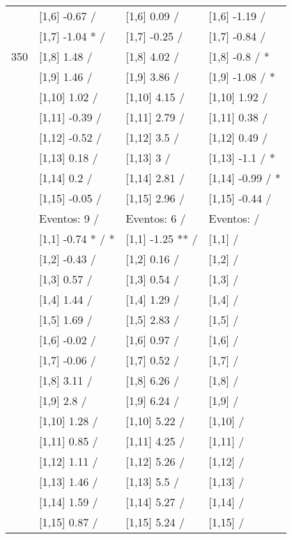 \begin{table}
\begin{tabular}[t]{llll}
 & {}[1,6] -0.67  / & {}[1,6] 0.09  / & {}[1,6] -1.19  /\\
 & {}[1,7] -1.04 * / & {}[1,7] -0.25  / & {}[1,7] -0.84  /\\
350 & {}[1,8] 1.48  / & {}[1,8] 4.02  / & {}[1,8] -0.8  / *\\
\addlinespace
 & {}[1,9] 1.46  / & {}[1,9] 3.86  / & {}[1,9] -1.08  / *\\
 & {}[1,10] 1.02  / & {}[1,10] 4.15  / & {}[1,10] 1.92  /\\
 & {}[1,11] -0.39  / & {}[1,11] 2.79  / & {}[1,11] 0.38  /\\
 & {}[1,12] -0.52  / & {}[1,12] 3.5  / & {}[1,12] 0.49  /\\
 & {}[1,13] 0.18  / & {}[1,13] 3  / & {}[1,13] -1.1  / *\\
\addlinespace
 & {}[1,14] 0.2  / & {}[1,14] 2.81  / & {}[1,14] -0.99  / *\\
 & {}[1,15] -0.05  / & {}[1,15] 2.96  / & {}[1,15] -0.44  /\\
 & Eventos:  9 / & Eventos:  6 / & Eventos:   /\\
 & {}[1,1] -0.74 * / * & {}[1,1] -1.25 ** / & {}[1,1]  /\\
 & {}[1,2] -0.43  / & {}[1,2] 0.16  / & {}[1,2]  /\\
\addlinespace
 & {}[1,3] 0.57  / & {}[1,3] 0.54  / & {}[1,3]  /\\
 & {}[1,4] 1.44  / & {}[1,4] 1.29  / & {}[1,4]  /\\
 & {}[1,5] 1.69  / & {}[1,5] 2.83  / & {}[1,5]  /\\
 & {}[1,6] -0.02  / & {}[1,6] 0.97  / & {}[1,6]  /\\
 & {}[1,7] -0.06  / & {}[1,7] 0.52  / & {}[1,7]  /\\
\addlinespace
500 & {}[1,8] 3.11  / & {}[1,8] 6.26  / & {}[1,8]  /\\
 & {}[1,9] 2.8  / & {}[1,9] 6.24  / & {}[1,9]  /\\
 & {}[1,10] 1.28  / & {}[1,10] 5.22  / & {}[1,10]  /\\
 & {}[1,11] 0.85  / & {}[1,11] 4.25  / & {}[1,11]  /\\
 & {}[1,12] 1.11  / & {}[1,12] 5.26  / & {}[1,12]  /\\
\addlinespace
 & {}[1,13] 1.46  / & {}[1,13] 5.5  / & {}[1,13]  /\\
 & {}[1,14] 1.59  / & {}[1,14] 5.27  / & {}[1,14]  /\\
 & {}[1,15] 0.87  / & {}[1,15] 5.24  / & {}[1,15]  /\\
\bottomrule
\end{tabular}
\end{table}
